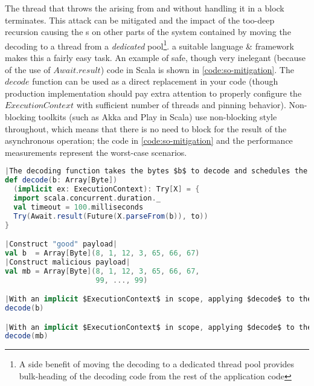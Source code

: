 The thread that throws the  arising from  and  without handling it in a  block terminates. This attack can be mitigated and the impact of the too-deep recursion causing the s on other parts of the system contained by moving the decoding to a thread from a \emph{dedicated} pool\footnote{A side benefit of moving the decoding to a dedicated thread pool provides bulk-heading of the decoding code from the rest of the application code}. a suitable language \& framework makes this a fairly easy task. An example of safe, though very inelegant (because of the use of $Await.result$) code in Scala is shown in \autoref{code:so-mitigation}. The $decode$ function can be used as a direct replacement in your code (though production implementation should pay extra attention to properly configure the $ExecutionContext$ with sufficient number of threads and pinning behavior). Non-blocking toolkits (such as Akka\cite{akka} and Play\cite{play} in Scala) use non-blocking style throughout, which means that there is no need to block for the result of the asynchronous operation; the code in \autoref{code:so-mitigation} and the performance measurements represent the worst-case scenarios.

\begin{lstlisting}[caption={Stack Overflow Mitigation}, label={code:so-mitigation}, language=Scala, escapechar=|]
|The decoding function takes the bytes $b$ to decode and schedules the decoding in the $ec$. It returns the result of the decoding, but will survive a $StackOverflowError$.|
def decode(b: Array[Byte])
  (implicit ex: ExecutionContext): Try[X] = {
  import scala.concurrent.duration._
  val timeout = 100.milliseconds
  Try(Await.result(Future(X.parseFrom(b)), to))
}

|Construct "good" payload|
val b  = Array[Byte](8, 1, 12, 3, 65, 66, 67)
|Construct malicious payload|
val mb = Array[Byte](8, 1, 12, 3, 65, 66, 67, 
                     99, ..., 99)

|With an implicit $ExecutionContext$ in scope, applying $decode$ to the good payload $b$ returns $Success(X(...))$ in roughly \SI{17}{\milli \second}.|
decode(b)

|With an implicit $ExecutionContext$ in scope, applying $decode$ to the good payload $b$ returns $Failure(TimeoutException)$ after the timeout of \SI{100}{\milli \second} elapses.|
decode(mb)
\end{lstlisting}

